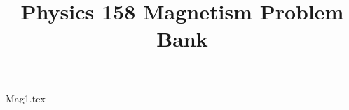 \documentclass[11pt, fleqn]{article}
\title{Physics 158 Magnetism Problem Bank}
\author{}
\date{}
\begin{document}
\allowdisplaybreaks

\maketitle

{Mag1.tex}
\end{document}

